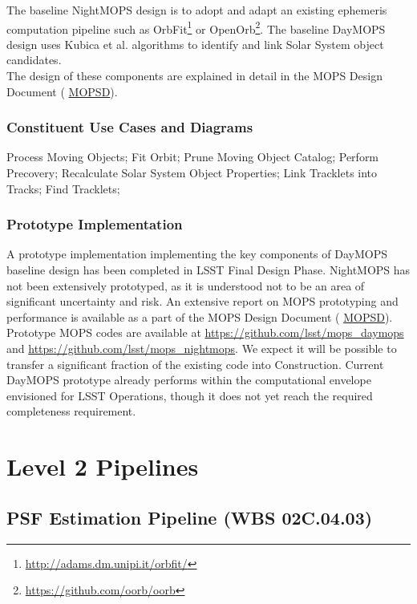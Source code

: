 \documentclass[12pt]{article}
\newcommand{\ds}[2]{{\color{blue} \href{https://docushare.lsstcorp.org/docushare/dsweb/Get/#1}{#2}}\xspace}
\newcommand{\MOPSD}{\ds{LDM-156}{MOPSD}}
\newcommand{\wbsPSF}{WBS 02C.04.03}
\begin{document}
The baseline NightMOPS design is to adopt and adapt an existing ephemeris computation pipeline such as OrbFit\footnote{\url{http://adams.dm.unipi.it/orbfit/}} or OpenOrb\footnote{\url{https://github.com/oorb/oorb}}. The baseline DayMOPS design uses Kubica et al. \cite{Kubica05} algorithms to identify and link Solar System object candidates.
\\

The design of these components are explained in detail in the MOPS Design Document (\MOPSD).

\subsubsection{Constituent Use Cases and Diagrams}

Process Moving Objects;
Fit Orbit; Prune Moving Object Catalog; Perform Precovery; Recalculate Solar System Object Properties; Link Tracklets into Tracks; Find Tracklets;

\subsubsection{Prototype Implementation}

A prototype implementation implementing the key components of DayMOPS baseline design has been completed in LSST Final Design Phase. NightMOPS has not been extensively prototyped, as it is understood not to be an area of significant uncertainty and risk. An extensive report on MOPS prototyping and performance is available as a part of the MOPS Design Document (\MOPSD).
\\

Prototype MOPS codes are available at \url{https://github.com/lsst/mops_daymops} and \url{https://github.com/lsst/mops_nightmops}. We expect it will be possible to transfer a significant fraction of the existing code into Construction. Current DayMOPS prototype already performs within the computational envelope envisioned for LSST Operations, though it does not yet reach the required completeness requirement.

\clearpage

\section{Level 2 Pipelines}

\subsection{PSF Estimation Pipeline (\wbsPSF)}
\end{document}
